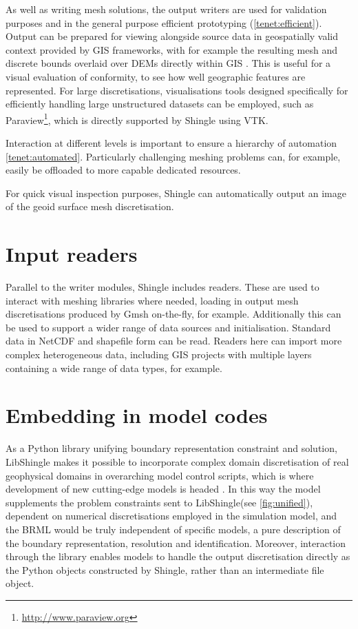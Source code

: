 \documentclass[a4paper, 10pt]{book}
\providecommand{\shingle}{Shingle\xspace}
\providecommand{\libshingle}{LibShingle\xspace}
\providecommand{\brml}{BRML\xspace}
\providecommand{\brep}{boundary representation\xspace}
\begin{document}
As well as writing mesh solutions, the output writers are used for validation purposes and in the general purpose efficient prototyping (\cref{tenet:efficient}).
Output can be prepared for viewing alongside source data in geospatially valid context provided by GIS frameworks, with for example the resulting mesh and discrete bounds overlaid over DEMs directly within GIS \citep[see][]{candygis}.
This is useful for a visual evaluation of conformity, to see how well geographic features are represented.
For large discretisations, visualisations tools designed specifically for efficiently handling large unstructured datasets can be employed, such as 
Paraview\footnote{\url{http://www.paraview.org}},
which is directly supported by \shingle using VTK.

Interaction at different levels is important to ensure a hierarchy of automation \cref{tenet:automated}.
Particularly challenging meshing problems can, for example, easily be offloaded to more capable dedicated resources.

For quick visual inspection purposes, \shingle can automatically output an image of the geoid surface mesh discretisation.


\section{Input readers}
%
Parallel to the writer modules, \shingle includes readers.
These are used to interact with meshing libraries where needed, loading in output mesh discretisations produced by Gmsh on-the-fly, for example.
%
Additionally this can be used to support a wider range of data sources and initialisation.
%
Standard data in NetCDF and shapefile form can be read.
Readers here can import more complex heterogeneous data, including GIS projects with multiple layers containing a wide range of data types, for example.



\section{Embedding in model codes}
%
%
As a Python library unifying \brep constraint and solution, \libshingle makes it possible to incorporate complex domain discretisation of real geophysical domains in overarching model control scripts, which is where development of new cutting-edge models is headed
\citep[see for example,][]{firedrake,omuse}.
%
In this way the model supplements the problem constraints sent to \libshingle (see \cref{fig:unified}),
dependent on numerical discretisations employed
in the simulation model, and
the \brml would be truly independent of specific models, a pure description of the boundary representation, resolution and identification.
%
Moreover, interaction through the library enables models to
handle the output discretisation directly as the Python objects constructed by \shingle, rather than an intermediate file object.
\end{document}
